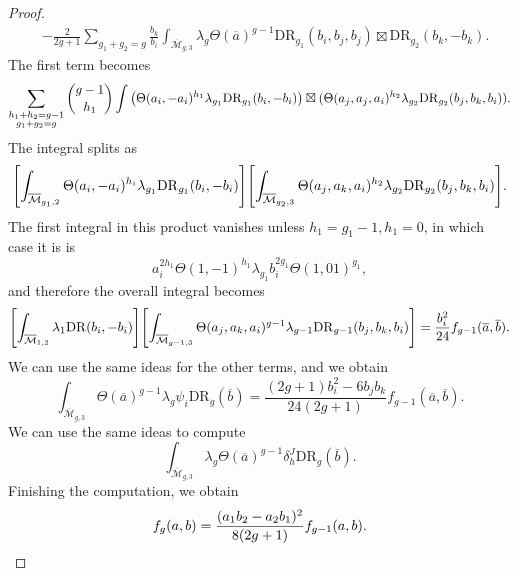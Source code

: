 \documentclass[leqno, openany]{memoir}
\theoremstyle{definition}
\theoremstyle{remark}
\theoremstyle{plain}
\theoremstyle{definition}
\theoremstyle{remark}
\newcommand{\mc}[1]{\mathcal{#1}}
\newcommand{\mr}[1]{\mathrm{#1}}
\newcommand{\ol}[1]{\overline{#1}}
\begin{document}
\begin{proof}
\begin{align*}
        & -\frac{2}{2g+1} \sum_{g_1 + g_2 = g} \frac{b_k}{b_i}\int_{\ol{\mc{M}}_{g,3}} \lambda_g \Theta(\ol{a})^{g-1} \mr{DR}_{g_1}(b_i, b_j, b_j) \boxtimes \mr{DR}_{g_2}(b_k,-b_k).
    \end{align*}
    The first term becomes
    \[ \sum_{\substack{h_1+h_2 = g-1 \\ g_1+g_2 =  g}} \binom{g-1}{h_1} \int \qty(\Theta(a_i,-a_i)^{h_1} \lambda_{g_1} \mr{DR}_{g_1}(b_i,-b_i)) \boxtimes (\Theta(a_j, a_j, a_i)^{h_2} \lambda_{g_2} \mr{DR}_{g_2}(b_j, b_k, b_i)). \]
    The integral splits as
    \[ \qty[\int_{\ol{\mc{M}}_{g_1, 2}} \Theta(a_i,-a_i)^{h_i} \lambda_{g_1} \mr{DR}_{g_1}(b_i,-b_i)]\qty[\int_{\ol{\mc{M}}_{g_2,3}} \Theta(a_j, a_k, a_i)^{h_2} \lambda_{g_2} \mr{DR}_{g_2}(b_j, b_k, b_i)]. \] 
    The first integral in this product vanishes unless $h_1=g_1-1, h_1 = 0$, in which case it is is
    \[ a_i^{2h_1} \Theta(1,-1)^{h_1} \lambda_{g_1} b_i^{2g_1} \Theta(1, 01)^{g_1}, \]
    and therefore the overall integral becomes
    \[ \qty[\int_{\ol{\mc{M}}_{1,2}}\lambda_1 \mr{DR}(b_i, -b_i)] \qty[\int_{\ol{\mc{M}}_{g-1,3}}\Theta(a_j, a_k, a_i)^{g-1} \lambda_{g-1}\mr{DR}_{g-1}(b_j, b_k, b_i)] = \frac{b_i^2}{24} f_{g-1}(\ol{a}, \ol{b}). \]
    We can use the same ideas for the other terms, and we obtain
    \[ \int_{\ol{\mc{M}}_{g, 3}} \Theta(\ol{a})^{g-1}\lambda_g \psi_i \mr{DR}_g(\ol{b}) = \frac{(2g+1)b_i^2 - 6 b_jb_k}{24(2g+1)}f_{g-1}(\ol{a}, \ol{b}). \]
    We can use the same ideas to compute
    \[ \int_{\ol{\mc{M}}_{g,3}}\lambda_g \Theta(\ol{a})^{g-1} \delta_h^J \mr{DR}_g(\ol{b}). \]
    Finishing the computation, we obtain
    \[ f_g(a, b) = \frac{(a_1b_2 - a_2 b_1)^2}{8(2g+1)} f_{g-1}(a,b). \qedhere \]
\end{proof}
\end{document}
